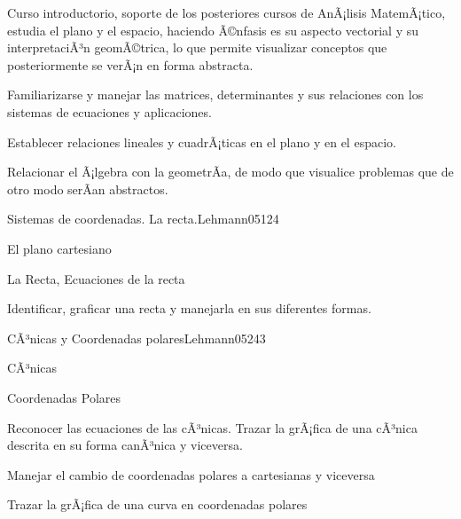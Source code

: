 \begin{syllabus}


\begin{justification}
Curso introductorio, soporte de los posteriores cursos de AnÃ¡lisis MatemÃ¡tico, 
estudia el plano y el espacio, haciendo Ã©nfasis es su aspecto vectorial y su interpretaciÃ³n geomÃ©trica, 
lo que permite visualizar conceptos que posteriormente se verÃ¡n en forma abstracta.
\end{justification}

\begin{goals}
\item Familiarizarse y manejar las matrices, determinantes y sus relaciones con los sistemas de ecuaciones y aplicaciones.
\item Establecer relaciones lineales y cuadrÃ¡ticas en el plano y en el espacio.
\item Relacionar el Ã¡lgebra con la geometrÃ­a, de modo que visualice problemas que de otro modo serÃ­an abstractos.
\end{goals}

\begin{outcomes}
\end{outcomes}

\begin{unit}{Sistemas de coordenadas. La recta.}{Lehmann05}{12}{4}
   \begin{topics}
      \item El plano cartesiano
      \item La Recta, Ecuaciones de la recta
   \end{topics}
   \begin{learningoutcomes}
      \item Identificar, graficar una recta y manejarla en sus diferentes formas.
   \end{learningoutcomes}
\end{unit}

\begin{unit}{CÃ³nicas y Coordenadas polares}{Lehmann05}{24}{3}
   \begin{topics}
      \item CÃ³nicas
      \item Coordenadas Polares
   \end{topics}

   \begin{learningoutcomes}
      \item Reconocer las ecuaciones de las cÃ³nicas. Trazar la grÃ¡fica de una cÃ³nica descrita en su forma canÃ³nica y viceversa.
      \item Manejar el cambio de coordenadas polares a cartesianas y viceversa
      \item Trazar la grÃ¡fica de una curva en coordenadas polares
      \end{learningoutcomes}
\end{unit}


\end{syllabus}
